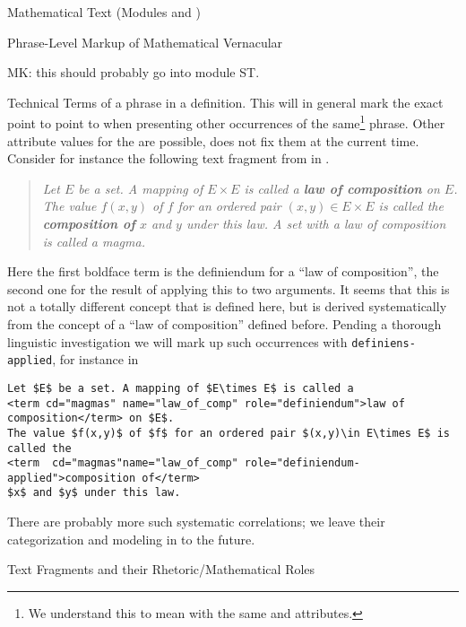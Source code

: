 \begin{tchapter}[id=mtxt,short=Mathematical Text]{Mathematical Text (Modules
  {} and {})}
\begin{tsection}[id=phrases]{Phrase-Level Markup of Mathematical Vernacular}
\begin{oldpart}{MK: this should probably go into module ST.}
\begin{tsubsection}[id=terms]{Technical Terms}
of a phrase in a definition.  This will in general mark the exact point to point to when
presenting other occurrences of the same\footnote{We understand this to mean with the same
  {} and {} attributes.} phrase. Other attribute
values for the {} are possible, {\omdoc} does not fix them at the
current time.  Consider for instance the following text fragment from
{} in {}.

\begin{quote}
  {} {\emph{Let $E$ be a set. A mapping of $E\times E$ is called a {\bf{law
        of composition}} on $E$. The value $f(x,y)$ of $f$ for an ordered pair $(x,y)\in
    E\times E$ is called the {\bf{composition of}} $x$ and $y$ under this law.  A set with
    a law of composition is called a magma.}}
\end{quote}
Here the first boldface term is the definiendum for a ``law of composition'', the second
one for the result of applying this to two arguments. It seems that this is not a totally
different concept that is defined here, but is derived systematically from the concept of
a ``law of composition'' defined before. Pending a thorough linguistic investigation we
will mark up such occurrences with {\tt{definiens-applied}}, for instance in

\begin{lstlisting}[mathescape,caption={Marking up the Technical Terms},label=lst:terms]
Let $E$ be a set. A mapping of $E\times E$ is called a 
<term cd="magmas" name="law_of_comp" role="definiendum">law of composition</term> on $E$. 
The value $f(x,y)$ of $f$ for an ordered pair $(x,y)\in E\times E$ is called the 
<term  cd="magmas"name="law_of_comp" role="definiendum-applied">composition of</term>
$x$ and $y$ under this law.
\end{lstlisting}
There are probably more such systematic correlations; we leave their categorization and
modeling in {\omdoc} to the future.
\end{tsubsection}
\end{oldpart}
\end{tsection}

\begin{tsection}[id=omtext]{Text Fragments and their Rhetoric/Mathematical Roles}


\end{tsection}
\end{tchapter}
